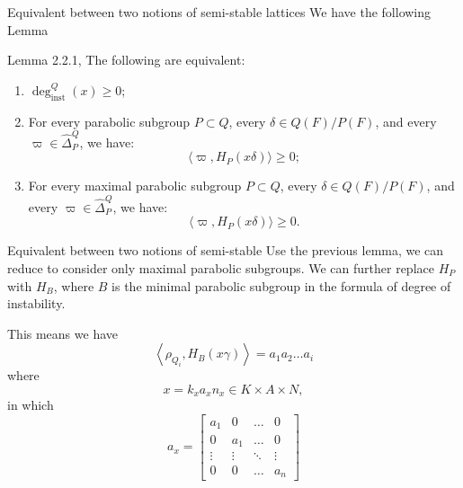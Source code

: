 \documentclass[pdf]{beamer}
\begin{document}
\begin{frame}{Equivalent between two notions of semi-stable lattices}
    We have the following Lemma
    \begin{block}{Lemma 2.2.1, \cite{chaudouard2016variante}}
        The following are equivalent:
        \begin{enumerate}
            \item \(\deg^Q_{\text{inst}}(x) \geq 0\);
            \item For every parabolic subgroup \( P \subset Q \), every \( \delta \in Q(F)/P(F)\), and every \( \varpi \in \hat{\Delta}_P^Q \), we have:
                  \[
                      \langle \varpi, H_P(x\delta ) \rangle \geq 0;
                  \]
            \item For every maximal parabolic subgroup \( P \subset Q \), every \( \delta \in Q(F)/P(F) \), and every \( \varpi \in \hat{\Delta}_P^Q \), we have:
                  \[
                      \langle \varpi, H_P(x\delta ) \rangle \geq 0.
                  \]
        \end{enumerate}
    \end{block}
\end{frame}
\begin{frame}{Equivalent between two notions of semi-stable}
    Use the previous lemma, we can reduce to consider only maximal parabolic subgroups. We can further replace $H_P$ with $H_B$, where $B$ is the minimal parabolic subgroup in the formula of degree of instability.

    This means we have
    \[\left\langle \rho_{Q_i}, H_B(x\gamma)   \right\rangle = a_1a_2\ldots a_i\]\pause
    where
    \[x = k_xa_xn_x \in K \times A \times N,\]
    in which
    \[a_x = \begin{bmatrix}
            a_1    & 0      & \ldots & 0      \\
            0      & a_1    & \ldots & 0      \\
            \vdots & \vdots & \ddots & \vdots \\
            0      & 0      & \ldots & a_n
        \end{bmatrix}\]
\end{frame}
\end{document}
